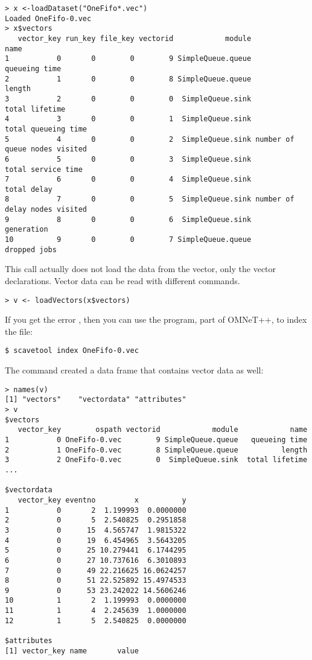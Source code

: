 \begin{verbatim}
> x <-loadDataset("OneFifo*.vec")
Loaded OneFifo-0.vec
> x$vectors
   vector_key run_key file_key vectorid            module                          name
1           0       0        0        9 SimpleQueue.queue                 queueing time
2           1       0        0        8 SimpleQueue.queue                        length
3           2       0        0        0  SimpleQueue.sink                total lifetime
4           3       0        0        1  SimpleQueue.sink           total queueing time
5           4       0        0        2  SimpleQueue.sink number of queue nodes visited
6           5       0        0        3  SimpleQueue.sink            total service time
7           6       0        0        4  SimpleQueue.sink                   total delay
8           7       0        0        5  SimpleQueue.sink number of delay nodes visited
9           8       0        0        6  SimpleQueue.sink                    generation
10          9       0        0        7 SimpleQueue.queue                  dropped jobs
\end{verbatim}

This call actually does not load the data from the vector, only the vector declarations. 
Vector data can be read with different commands.

\begin{verbatim}
> v <- loadVectors(x$vectors)
\end{verbatim}

If you get the error , then
you can use the  program, part of OMNeT++, to index the file: 

\begin{verbatim}
$ scavetool index OneFifo-0.vec
\end{verbatim}

The  command created a data frame that contains vector data as well:

\begin{verbatim}
> names(v)
[1] "vectors"    "vectordata" "attributes"
> v
$vectors
   vector_key        ospath vectorid            module            name
1           0 OneFifo-0.vec        9 SimpleQueue.queue   queueing time
2           1 OneFifo-0.vec        8 SimpleQueue.queue          length
3           2 OneFifo-0.vec        0  SimpleQueue.sink  total lifetime
...

$vectordata
   vector_key eventno         x          y
1           0       2  1.199993  0.0000000
2           0       5  2.540825  0.2951858
3           0      15  4.565747  1.9815322
4           0      19  6.454965  3.5643205
5           0      25 10.279441  6.1744295
6           0      27 10.737616  6.3010893
7           0      49 22.216625 16.0624257
8           0      51 22.525892 15.4974533
9           0      53 23.242022 14.5606246
10          1       2  1.199993  0.0000000
11          1       4  2.245639  1.0000000
12          1       5  2.540825  0.0000000

$attributes
[1] vector_key name       value     
\end{verbatim}

